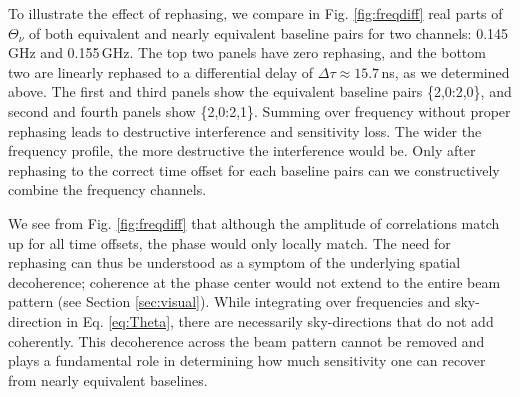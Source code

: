 \documentclass[twocolumn,apj,numberedappendix]{emulateapj}
\renewcommand\[{\begin{equation}}
\renewcommand\]{\end{equation}}
\begin{document}
To illustrate the effect of rephasing, we compare in Fig. \ref{fig:freqdiff} real parts of $\Theta_{\nu}$ of both equivalent and nearly equivalent baseline pairs for two channels: 0.145\,GHz and 0.155\,GHz. The top two panels have zero rephasing, and the bottom two are linearly rephased to a differential delay of $\Delta\tau\approx15.7$\,ns, as we determined above. The first and third panels show the equivalent baseline pairs \{2,0:2,0\}, and second and fourth panels show \{2,0:2,1\}. Summing over frequency without proper rephasing leads to destructive interference and sensitivity loss. The wider the frequency profile, the more destructive the interference would be. Only after rephasing to the correct time offset for each baseline pairs can we constructively combine the frequency channels. 

We see from Fig. \ref{fig:freqdiff} that although the amplitude of correlations match up for all time offsets, the phase would only locally match. The need for rephasing can thus be understood as a symptom of the underlying spatial decoherence; coherence at the phase center would not extend to the entire beam pattern (see Section \ref{sec:visual}). While integrating over frequencies and sky-direction in Eq. \eqref{eq:Theta}, there are necessarily sky-directions that do not add coherently. This decoherence across the beam pattern cannot be removed and plays a fundamental role in determining how much sensitivity one can recover from nearly equivalent baselines. 
\end{document}
